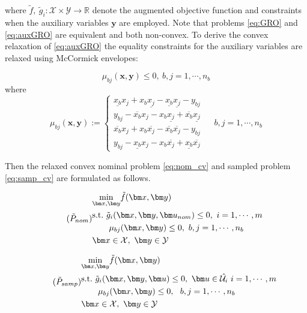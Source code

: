 \documentclass[sn-mathphys-num]{sn-jnl}
\begin{document}
where $\tilde{f},~\tilde{g}_i:\mathcal{X}\times \mathcal{Y}\rightarrow\mathbb{R}$ denote the augmented objective function and constraints when the auxiliary variables $\bm y$ are employed. Note that problems \eqref{eq:GRO} and \eqref{eq:auxGRO} are equivalent and both non-convex. To derive the convex relaxation of \eqref{eq:auxGRO} the equality constraints for the auxiliary variables are relaxed using McCormick envelopes\citep{McCormick1976}:

\begin{equation}
   \mu_{bj}(\bm x, \bm y)\leq 0,~b,j=1,\cdots, n_b 
\end{equation}
where
\begin{equation}\label{eq:env}
    \mu_{bj}(\bm x, \bm y):=\begin{cases}
     \underline{x_b}x_j+x_b\underline{x_j} -\underline{x_b}\underline{x_j}-   y_{bj} \\
     y_{bj}-\overline{x_b}x_j-x_b\underline{x_j}+\overline{x_b}\underline{x_j}\\
     \overline{x_b}x_j +x_b\overline{x_j}-\overline{x_b}\overline{x_j}-y_{bj}\\
     y_{bj}-\underline{x_b}x_j-x_b\overline{x_j}+\underline{x_b}\overline{x_j}\
    \end{cases} \quad b,j=1,\cdots, n_b
\end{equation}


Then the relaxed convex nominal problem \eqref{eq:nom_cv} and sampled problem \eqref{eq:samp_cv} are formulated as follows.

\begin{equation}\tag{$\tilde{P}_{nom}$}\label{eq:nom_cv}
\begin{aligned}
&\underset{\bm x, \bm y}{\min}\tilde{f}(\bm x, \bm y)\\
&\text{s.t.}~ \tilde{g}_i(\bm x,\bm y,\bm u_{nom})\leq 0 , ~i=1,\cdots,m\\
& \qquad \mu_{bj}(\bm x,\bm y)\leq 0, ~b,j=1,\cdots, n_b\\
&\bm x \in \mathcal{X}, ~\bm y \in \mathcal{Y}
\end{aligned}
\end{equation}

\begin{equation}\tag{$\tilde{P}_{samp}$}\label{eq:samp_cv}
\begin{aligned}
&\underset{\bm x, \bm y}{\min}\tilde{f}(\bm x, \bm y)\\
&\text{s.t.}~ \tilde{g}_i(\bm x,\bm y,\bm u)\leq 0 ,~ \bm u \in \hat{\mathcal{U}_i} ~i=1,\cdots,m\\
& \qquad \mu_{bj}(\bm x,\bm y)\leq 0,  ~ ~b,j=1,\cdots, n_b\\
&\bm x \in \mathcal{X}, ~\bm y \in \mathcal{Y}
\end{aligned}
\end{equation}
 
\end{document}
